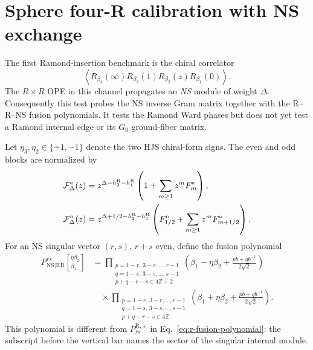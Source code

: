 \documentclass[11pt]{article}
\newcommand{\NS}{\mathrm{NS}}
\newcommand{\R}{\mathrm{R}}
\newcommand{\F}{\mathcal F}
\begin{document}
\section{Sphere four-R calibration with NS exchange}
\label{sec:four-r-calibration}

The first Ramond-insertion benchmark is the chiral correlator
\begin{equation}
 \left\langle
 R_{\beta_4}(\infty)R_{\beta_3}(1)
 R_{\beta_2}(z)R_{\beta_1}(0)
 \right\rangle .
 \label{eq:four-r-ordering}
\end{equation}
The $R\times R$ OPE in this channel propagates an \emph{NS} module of weight
$\Delta$.  Consequently this test probes the NS inverse Gram matrix together
with the R--R--NS fusion polynomials.  It tests the Ramond Ward phases but
does not yet test a Ramond internal edge or its $G_0$ ground-fiber matrix.

Let $\eta_3,\eta_2\in\{+1,-1\}$ denote the two HJS chiral-form signs.  The
even and odd blocks are normalized by
\begin{align}
 \F_\Delta^{\rm e}(z)
 &=z^{\Delta-h_2^\R-h_1^\R}
   \left(1+\sum_{m\ge1}z^m F_m^{\rm e}\right),
 \notag\\
 \F_\Delta^{\rm o}(z)
 &=z^{\Delta+1/2-h_2^\R-h_1^\R}
   \left(F_{1/2}^{\rm o}
   +\sum_{m\ge1}z^mF_{m+1/2}^{\rm o}\right).
 \label{eq:four-r-local-blocks}
\end{align}
For an NS singular vector $(r,s)$, $r+s$ even, define the fusion polynomial
\begin{equation}
\begin{aligned}
 P_{\NS|\R\R}^{rs}
 \left[{}^{\eta\beta_2}_{\beta_1}\right]
 &=
 \prod_{\substack{p=1-r,\,3-r,\ldots,r-1\\
                   q=1-s,\,3-s,\ldots,s-1\\
                   p+q-r-s\in4\mathbb Z+2}}
 \left(\beta_1-\eta\beta_2
       +\frac{pb+qb^{-1}}{2\sqrt2}\right)
 \\[-0.1em]
 &\quad\times
 \prod_{\substack{p=1-r,\,3-r,\ldots,r-1\\
                   q=1-s,\,3-s,\ldots,s-1\\
                   p+q-r-s\in4\mathbb Z}}
 \left(\beta_1+\eta\beta_2
       +\frac{pb+qb^{-1}}{2\sqrt2}\right).
\end{aligned}
\label{eq:ns-rr-fusion-polynomial}
\end{equation}
This polynomial is different from
$P_{rs}^{\R,\pm}$ in Eq.~\eqref{eq:r-fusion-polynomial}: the subscript before
the vertical bar names the sector of the singular internal module.
\end{document}
